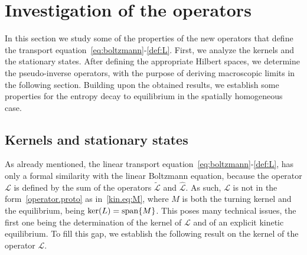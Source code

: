 \documentclass[a4paper]{article}
\theoremstyle{Theorem}\newtheorem{proposition}{Proposition}[section]
\theoremstyle{Remark}\newtheorem{remark}{Remark}[section]
\theoremstyle{Theorem}\newtheorem{theorem}{Theorem}[section]
\begin{document}
\section{Investigation of the operators}\label{sec:operators}

In this section we study some of the properties of the new operators that define the transport equation~\eqref{eq:boltzmann}-\eqref{def:L}. First, we analyze the kernels and the stationary states. After defining the appropriate Hilbert spaces, we determine the pseudo-inverse operators, with the purpose of deriving macroscopic limits in the following section. Building upon the obtained results, we establish some properties for the entropy decay to equilibrium in the spatially homogeneous case. 


    





\subsection{Kernels and stationary states}

As already mentioned, the linear transport equation~\eqref{eq:boltzmann}-\eqref{def:L}, has only a formal similarity with the linear Boltzmann equation, because the operator $\mathcal{L}$ is defined by the sum of the operators $\tilde{\mathcal{L}}$ and $\hat{\mathcal{L}}$. As such, $\mathcal{L}$ is not in the form~\eqref{operator.proto} as in~\eqref{kin.eq:M}, where $M$ is both the turning kernel and the equilibrium, being $\ker(L)={\rm span}\lbrace M\rbrace$. This poses many technical issues, the first one being the determination of the kernel of $\mathcal{L}$ and of an explicit kinetic equilibrium. To fill this gap, we establish the following result on the kernel of the operator $\mathcal{L}$.
\end{document}
